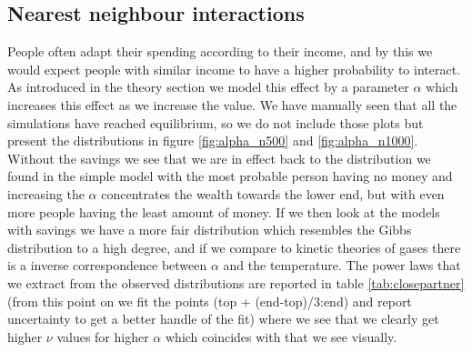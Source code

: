 \documentclass[a4paper,11pt]{article}
\begin{document}
{\subsection{Nearest neighbour interactions}
People often adapt their spending according to their income, and by this we would expect people with similar income to have a higher probability to interact. As introduced in the theory section we model this effect by a parameter $\alpha$ which increases this effect as we increase the value. We have manually seen that all the simulations have reached equilibrium, so we do not include those plots but present the distributions in figure \ref{fig:alpha_n500} and \ref{fig:alpha_n1000}. Without the savings we see that we are in effect back to the distribution we found in the simple model with the most probable person having no money and increasing the $\alpha$ concentrates the wealth towards the lower end, but with even more people having the least amount of money. If we then look at the models with savings we have a more fair distribution which resembles the Gibbs distribution to a high degree, and if we compare to kinetic theories of gases there is a inverse correspondence between $\alpha$ and the temperature. The power laws that we extract from the observed distributions are reported in table \ref{tab:closepartner}(from this point on we fit the points (top + (end-top)/3:end) and report uncertainty to get a better handle of the fit) where we see that we clearly get higher $\nu$ values for higher $\alpha$ which coincides with that we see visually. 

}
\end{document}
